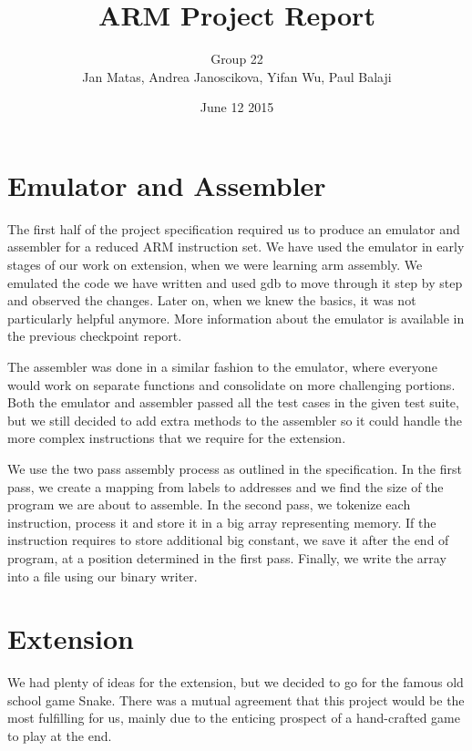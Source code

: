 \documentclass[9pt]{article}
\title{ARM Project Report}
\author{Group 22\\Jan Matas, Andrea Janoscikova, Yifan Wu, Paul Balaji}
\date{June 12 2015}
\begin{document}
\maketitle

\section*{Emulator and Assembler}
The first half of the project specification required us to produce an emulator and assembler for a reduced ARM instruction set. We have used the emulator in early stages of our work on extension, when we were learning arm assembly. We emulated the code we have written  and used gdb to move through it step by step and observed the changes. Later on, when we knew the basics, it was not particularly helpful anymore. More information about the emulator is available in the previous checkpoint report.

The assembler was done in a similar fashion to the emulator, where everyone would work on separate functions and consolidate on more challenging portions. Both the emulator and assembler passed all the test cases in the given test suite, but we still decided to add extra methods to the assembler so it could handle the more complex instructions that we require for the extension.

We use the two pass assembly process as outlined in the specification. In the first pass, we create a mapping from labels to addresses and we find the size of the program we are about to assemble. In the second pass, we tokenize each instruction, process it and store it in a big array representing memory. If the instruction requires to store additional big constant, we save it after the end of program, at a position determined in the first pass. Finally, we write the array into a file using our binary writer.

\section*{Extension}
We had plenty of ideas for the extension, but we decided to go for the famous old school game Snake. There was a mutual agreement that this project would be the most fulfilling for us, mainly due to the enticing prospect of a hand-crafted game to play at the end.
\end{document}
